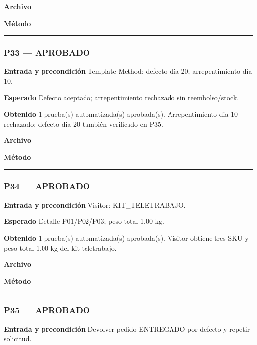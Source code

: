 \textbf{Archivo} \href{https://github.com/Alan77-bot/LogiMarket360Alan/blob/68bda51063441415524ede51bdf61649ee9b4973/tests/LogiMarket.Tests/Dominio/PromocionesTests.cs}{}

\textbf{Método} 

\medskip\hrule\medskip
\subsubsection*{P33 --- APROBADO}
\textbf{Entrada y precondición} Template Method: defecto día 20; arrepentimiento día 10.

\textbf{Esperado} Defecto aceptado; arrepentimiento rechazado sin reembolso/stock.

\textbf{Obtenido} 1 prueba(s) automatizada(s) aprobada(s). Arrepentimiento dia 10 rechazado; defecto dia 20 también verificado en P35.

\textbf{Archivo} \href{https://github.com/Alan77-bot/LogiMarket360Alan/blob/68bda51063441415524ede51bdf61649ee9b4973/tests/LogiMarket.Tests/Aplicacion/DevolucionesTests.cs}{}

\textbf{Método} 

\medskip\hrule\medskip
\subsubsection*{P34 --- APROBADO}
\textbf{Entrada y precondición} Visitor: KIT\_TELETRABAJO.

\textbf{Esperado} Detalle P01/P02/P03; peso total 1.00 kg.

\textbf{Obtenido} 1 prueba(s) automatizada(s) aprobada(s). Visitor obtiene tres SKU y peso total 1.00 kg del kit teletrabajo.

\textbf{Archivo} \href{https://github.com/Alan77-bot/LogiMarket360Alan/blob/68bda51063441415524ede51bdf61649ee9b4973/tests/LogiMarket.Tests/Patrones/ComportamentalesTests.cs}{}

\textbf{Método} 

\medskip\hrule\medskip
\subsubsection*{P35 --- APROBADO}
\textbf{Entrada y precondición} Devolver pedido ENTREGADO por defecto y repetir solicitud.

